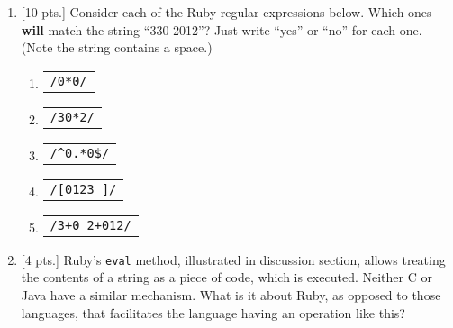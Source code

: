\documentclass[10pt]{article}
\makeatletter
\newcommand{\qfouranswer}[1]{%
    \begin{tabular}[t]{@{}p{1.25in}@{\lans}}%
      \texttt{/#1/}%
    \end{tabular}%
  }
\makeatother
\begin{document}
\begin{enumerate}
          \vspace{-1.5mm}

          \begin{multicols}{2}


            \columnbreak

            \centering


          \end{multicols}

          \turnover

    \item {[10 pts.]} Consider each of the Ruby regular expressions below.
          Which ones \textbf{will} match the string ``330 2012''?  Just
          write ``yes'' or ``no'' for each one.  (Note the string contains a
          space.)

          \begin{enumerate}

            \addtolength{\itemsep}{6mm}

            \item \qfouranswer{0*0}

            \item \qfouranswer{30*2}

            \item \qfouranswer{\string^0.*0\$}

            \item \qfouranswer{[0123 ]\string{8\string}}

            \item \qfouranswer{3+0 2+012}

          \end{enumerate}

          \vspace{-2.5mm}

    \item {[4 pts.]} Ruby's \texttt{eval} method, illustrated in
          discussion section, allows treating the contents of a string as a
          piece of code, which is executed.  Neither C or Java have a
          similar mechanism.  What is it about Ruby, as opposed to those
          languages, that facilitates the language having an operation like
          this?

  \end{enumerate}
\end{document}
